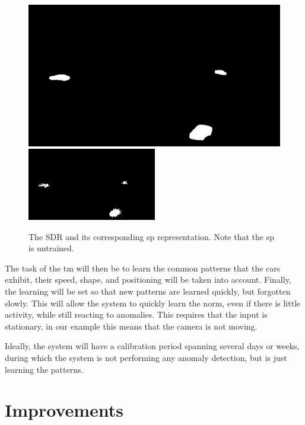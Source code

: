 \begin{figure}[H]
    \centering
    \includegraphics[width=.48\textwidth]{resources/methodology/car_segmentation.png}
    \includegraphics[width=.48\textwidth]{resources/methodology/car_segmentation_sp.png}
    \caption{The SDR and its corresponding \gls*{sp} representation. Note that the \gls*{sp} is untrained.}
\end{figure}
\par
The task of the \gls*{tm} will then be to learn the common patterns that the cars exhibit, their speed, shape, and positioning will be taken into account. Finally, the learning will be set so that new patterns are learned quickly, but forgotten slowly. This will allow the system to quickly learn the norm, even if there is little activity, while still reacting to anomalies. This requires that the input is stationary, in our example this means that the camera is not moving.
\par
Ideally, the system will have a calibration period spanning several days or weeks, during which the system is not performing any anomaly detection, but is just learning the patterns.\par
\section{Improvements}

